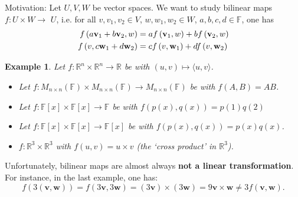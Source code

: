 \documentclass[11pt]{article}
\newtheorem{example}[theorem]{Example}
\begin{document}
Motivation: Let \(U,V,W\) be vector spaces. We want to study bilinear maps \(f : U \times  W \rightarrow\)  \(U\), i.e. for all $v,v_1, v_2 \in V$, $w, w_1,w_2 \in W$, $a,b,c,d \in \mathbb{F}$, one has
\begin{align*}
f\left( {a{\bf v}_1 + b{\bf v}_2,w}\right) &= {af}\left( {{\bf v}_1,w}\right)  + {bf}\left( {{\bf v}_2,w}\right)\\
f\left( {v,c{\bf w}_1 + d{\bf w}_2}\right) &= {cf}\left( {v,{\bf w}_1}\right)  + {df}\left( {v,{\bf w}_2}\right)
\end{align*}


\begin{example} Let \(f : {\mathbb{R}}^n \times  {\mathbb{R}}^n \rightarrow  \mathbb{R}\) be with \(\left( {u,v}\right)  \mapsto  \langle u,v\rangle\).

\begin{itemize}
\item Let \(f : {M}_{n \times  n}\left( \mathbb{F}\right)  \times  {M}_{n \times  n}\left( \mathbb{F}\right)  \rightarrow  {M}_{n \times  n}\left( \mathbb{F}\right)\) be with \(f\left( {A,B}\right)  = {AB}\).
\end{itemize}

\begin{itemize}
\item Let \(f : \mathbb{F}\left\lbrack  x\right\rbrack   \times  \mathbb{F}\left\lbrack  x\right\rbrack   \rightarrow  \mathbb{F}\) be with \(f\left( {p\left( x\right) ,q\left( x\right) }\right)  = p\left( 1\right) q\left( 2\right)\)
\end{itemize}

\begin{itemize}
\item Let \(f : \mathbb{F}\left\lbrack  x\right\rbrack   \times  \mathbb{F}\left\lbrack  x\right\rbrack   \rightarrow  \mathbb{F}\left\lbrack  x\right\rbrack\) be with \(f\left( {p\left( x\right) ,q\left( x\right) }\right)  = p\left( x\right) q\left( x\right)\).
\item \(
f : {\mathbb{R}}^{3} \times  {\mathbb{R}}^{3}
\)
with \(f\left( {u,v}\right)  = u \times  v\) (the `cross product' in $\mathbb{R}^3$).
\end{itemize}
\end{example}

Unfortunately, bilinear maps are almost always {\bf not a linear transformation}. For instance, in the last example, one has:
\[
f\left( {3\left( {\mathbf{v},\mathbf{w}}\right) }\right)  = f\left( {3\mathbf{v},3\mathbf{w}}\right)  = \left( {3\mathbf{v}}\right)  \times  \left( {3\mathbf{w}}\right)  = 9\mathbf{v} \times  \mathbf{w} \neq  {3f}\left( {\mathbf{v},\mathbf{w}}\right) .
\]
\end{document}
